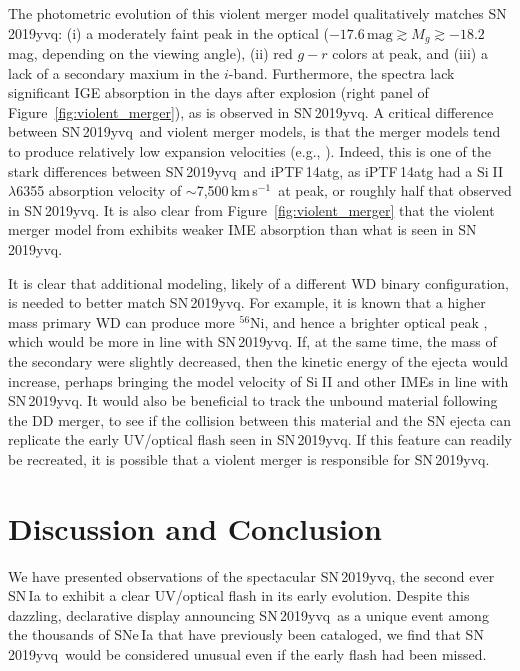 \documentclass[twocolumn]{aastex63}
\def\ion#1#2{#1$\;${\footnotesize\rm{#2}}\relax}
\newcommand{\aam}[1]{{\color{DarkOrange} aam: \textbf{#1}}}
\newcommand{\kms}{km\,s$^{-1}$}
\newcommand{\radni}{$^{56}$Ni}
\newcommand{\sn}{SN\,2019yvq}
\begin{document}
The photometric evolution of this violent merger model qualitatively matches
\sn: (i) a moderately faint peak in the optical ($-17.6\,\mathrm{mag} \gtrsim
M_g \gtrsim -18.2$\,mag, depending on the viewing angle), (ii) red $g - r$
colors at peak, and (iii) a lack of a secondary maxium in the $i$-band.
Furthermore, the spectra lack significant IGE absorption in the days after
explosion (right panel of Figure~\ref{fig:violent_merger}), as is observed in
\sn. A critical difference between \sn\ and violent merger models, is that the
merger models tend to produce relatively low expansion velocities (e.g.,
\citealt{Pakmor10,Kromer13a,Kromer16}). Indeed, this is one of the stark
differences between \sn\ and iPTF\,14atg, as iPTF\,14atg had a \ion{Si}{II}
$\lambda$6355 absorption velocity of $\sim$7,500\,\kms\ at peak, or roughly
half that observed in \sn. It is also clear from
Figure~\ref{fig:violent_merger} that the violent merger model from
\citet{Kromer16} exhibits weaker IME absorption than what is seen in \sn.

It is clear that additional modeling, likely of a different WD binary
configuration, is needed to better match \sn. For example, it is known that a
higher mass primary WD can produce more \radni, and hence a brighter optical
peak \citep[e.g.,][]{Pakmor12}, which would be more in line with \sn. If, at
the same time, the mass of the secondary were slightly decreased, then the
kinetic energy of the ejecta would increase, perhaps bringing the model
velocity of \ion{Si}{II} and other IMEs in line with \sn. It would also be
beneficial to track the unbound material following the DD merger, to see if
the collision between this material and the SN ejecta can replicate the early
UV/optical flash seen in \sn. If this feature can readily be recreated, it is
possible that a violent merger is responsible for \sn.

%
%

\section{Discussion and Conclusion}\label{sec:conclusions}

We have presented observations of the spectacular \sn, the second ever SN\,Ia
to exhibit a clear UV/optical flash in its early evolution. Despite this
dazzling, declarative display announcing \sn\ as a unique event among the
thousands of SNe\,Ia that have previously been cataloged, we find that \sn\
would be considered unusual even if the early flash had been missed.
\end{document}
